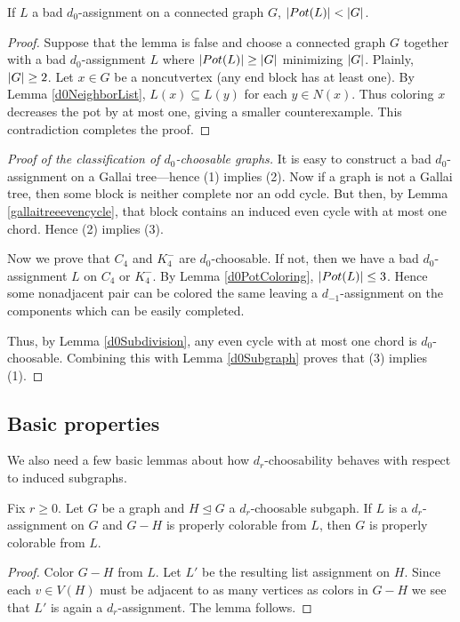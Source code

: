 \begin{lem}\label{d0PotColoring}
If $L$ a bad $d_0$-assignment on a connected graph $G$, $\left|Pot(L)\right| < \left|G\right|$.
\end{lem}
\begin{proof}
Suppose that the lemma is false and choose a connected graph $G$ together with a bad $d_0$-assignment $L$ where $\left|Pot(L)\right| \geq \left|G\right|$ minimizing $\left|G\right|$.  Plainly, $\left|G\right| \geq 2$.  Let $x \in G$ be a noncutvertex (any end block has at least one).  By Lemma \ref{d0NeighborList}, $L(x) \subseteq L(y)$ for each $y \in N(x)$. Thus coloring $x$ decreases the pot by at most one, giving a smaller counterexample.  This contradiction completes the proof.
\end{proof}

\begin{proof}[Proof of the classification of $d_0$-choosable graphs]
It is easy to construct a bad $d_0$-assignment on a Gallai tree---hence (1) implies (2).  Now if a graph is not a Gallai tree, then some block is neither complete nor an odd cycle.  But then, by Lemma \ref{gallaitreeevencycle}, that block contains an induced even cycle with at most one chord.  Hence (2) implies (3).  

Now we prove that $C_4$ and $K_4^-$ are $d_0$-choosable.  If not, then we have a bad $d_0$-assignment $L$ on $C_4$ or $K_4^-$.  By Lemma \ref{d0PotColoring}, $\left|Pot(L)\right| \leq 3$.  Hence some nonadjacent pair can be colored the same leaving a $d_{-1}$-assignment on the components which can be easily completed.

Thus, by Lemma \ref{d0Subdivision}, any even cycle with at most one chord is $d_0$-choosable.  Combining this with Lemma \ref{d0Subgraph} proves that (3) implies (1).
\end{proof}

\subsection{Basic properties}
We also need a few basic lemmas about how $d_r$-choosability behaves with respect to induced subgraphs.

\begin{lem}\label{PartialdkLemma}
Fix $r \geq 0$. Let $G$ be a graph and $H \unlhd G$ a $d_r$-choosable subgaph. If $L$ is a $d_r$-assignment on $G$ and $G - H$ is properly colorable from $L$, then $G$ is properly colorable from $L$.
\end{lem}
\begin{proof}
Color $G - H$ from $L$. Let $L'$ be the resulting list assignment on $H$.  Since each $v \in V(H)$ must be adjacent to as many vertices as colors in $G - H$ we see that $L'$ is again a $d_r$-assignment.  The lemma follows.
\end{proof}

